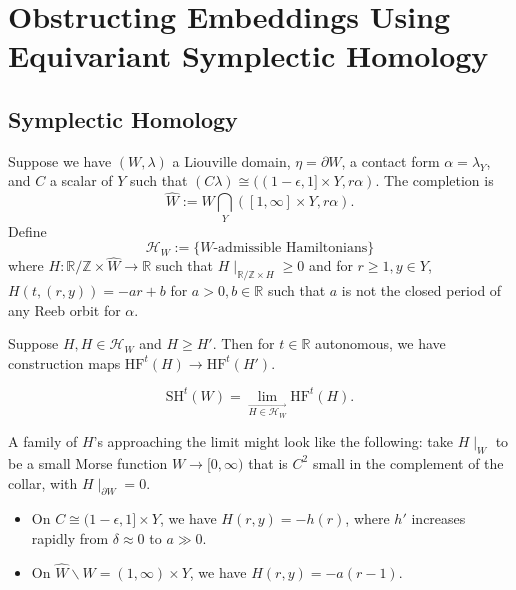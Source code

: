 \chapter{Obstructing Embeddings Using Equivariant Symplectic Homology}
\label{u3}


\section{Symplectic Homology}

Suppose we have $(W,\lambda)$ a Liouville domain, $\eta = \partial W$, a contact form $\alpha = \lambda_{Y}$, and $C$ a scalar of $Y$ such that $(C\lambda)\cong ((1-\epsilon, 1] \times Y, r\alpha)$. The completion is 
\[
\hat{W}:= W \bigcap_Y ([1,\infty] \times Y, r\alpha).
\]
Define
\[
\mathcal{H}_W:=\{W\text{-admissible Hamiltonians}\}
\]
where $H: \mathbb{R}/\mathbb{Z}\times \hat{W}\to \mathbb{R}$ such that $H \mid_{\mathbb{R}/\mathbb{Z}\times H} \ge 0$ and for $r\ge 1, y\in Y$, $H(t,(r,y))=-ar+b$ for $a>0, b\in \mathbb{R}$ such that $a$ is not the closed period of any Reeb orbit for $\alpha$.

Suppose $H, H \in \mathcal{H}_{W}$ and $H\ge H'$. Then for $t\in \mathbb{R}$ autonomous, we have construction maps $\text{HF}^{t}(H) \to \text{HF}^t(H')$.

\begin{definition}

\[
\text{SH}^t(W) = \lim_{\stackrel{\longrightarrow}{H\in \mathcal{H}_W}} \text{HF}^t(H).
\]

\end{definition}

A family of $H$'s approaching the limit might look like the following: take $H \mid_W$ to be a small Morse function $W\to [0,\infty)$ that is $C^2$ small in the complement of the collar, with $H \mid_{\partial W}=0$.

\begin{itemize}
\item On $C\cong (1-\epsilon, 1]\times Y$, we have $H(r,y)=-h(r)$, where $h'$ increases rapidly from $\delta \approx 0$ to $a \gg 0$.
\item On $\hat{W}\backslash W = (1,\infty)\times Y$, we have $H(r,y)=-a(r-1)$.
\end{itemize}

